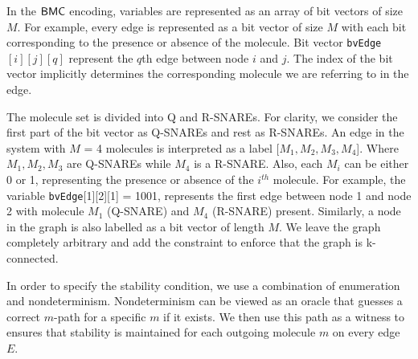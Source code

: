 In the $\mathsf{BMC}$ encoding, variables are represented as an array of bit vectors of size $M$. 
%
%
For example, every edge is represented as a bit vector of size $M$ with each bit corresponding to the presence or absence of the molecule. 
%
Bit vector \texttt{bvEdge}$[i][j][q]$ represent the $q$th edge between node $i$ and $j$.
%
The index of the bit vector implicitly determines the corresponding molecule we are referring to in the edge.
% 

The molecule set is divided into Q and R-SNAREs. 
%
For clarity, we consider the first part of the bit vector as Q-SNAREs and rest as R-SNAREs.
%
An edge in the system with $M$ = 4 molecules is interpreted as a label [$M_{1}, M_{2}, M_{3}, M_{4}$]. 
%
Where $M_{1}, M_{2}, M_{3}$ are Q-SNAREs while $M_{4}$ is a R-SNARE.
%
Also, each $M_i$ can be either 0 or 1, representing the presence or absence of the $i^{th}$ molecule.
%
For example, the variable \texttt{bvEdge}[1][2][1] = 1001, represents the first edge between node 1 and node 2 with molecule $M_{1}$ (Q-SNARE) and $M_{4}$ (R-SNARE) present. 
%
Similarly, a node in the graph is also labelled as a bit vector of length $M$.   
%
We leave the graph completely arbitrary and add the constraint to enforce that the graph is k-connected. 
%

In order to specify the stability condition, we use a combination of enumeration and nondeterminism.
%
Nondeterminism can be viewed as an oracle that guesses a correct $m$-path for a specific $m$ if it exists. 
%
We then use this path as a witness to ensures that stability is maintained for each outgoing molecule $m$ on every edge $E$.
%

